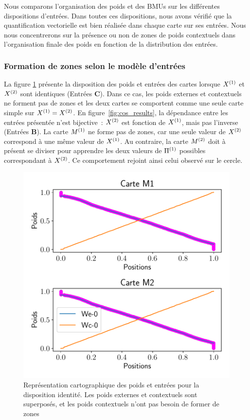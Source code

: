 \documentclass[../main]{subfiles}
\begin{document}
Nous comparons l'organisation des poids et des BMUs sur les différentes dispositions d'entrées.
Dans toutes ces dispositions, nous avons vérifié que la quantification vectorielle est bien réalisée dans chaque carte sur ses entrées. Nous nous concentrerons sur la présence ou non de zones de poids contextuels dans l'organisation finale des poids en fonction de la distribution des entrées.

\subsubsection{Formation de zones selon le modèle d'entrées}

La figure \ref{fig:id_results} présente la disposition des poids et entrées des cartes lorsque $X^{({1})}$ et $X^{({2})}$ sont identiques (Entrées \textbf{C}).
Dans ce cas, les poids externes et contextuels ne forment pas de zones et les deux cartes se comportent comme une seule carte simple sur $X^{({1})} = X^{({2})}$. 
En figure~\ref{fig:cos_results}, la dépendance entre les entrées présentée n'est bijective~: $X^{({2})}$ est fonction de $X^{({1})}$, mais pas l'inverse (Entrées \textbf{B}). 
La carte $M^{({1})}$ ne forme pas de zones, car une seule valeur de $X^{({2})}$ correspond à une même valeur de $X^{({1})}$.
Au contraire, la carte $M^{({2})}$ doit à présent se diviser pour apprendre les deux valeurs de $\Pi^{({1})}$ possibles correspondant à $X^{({2})}$. 
Ce comportement rejoint ainsi celui observé sur le cercle.

\begin{figure}
	\centering\includegraphics[width=\textwidth]{2som_id_w.pdf}
	\caption{Représentation cartographique des poids et entrées pour la disposition identité. Les poids externes et contextuels sont superposés, et les poids contextuels n'ont pas besoin de former de zones \label{fig:id_results}}
	\end{figure}
	
\end{document}
